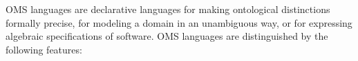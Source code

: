 \documentclass[10pt, a4paper]{isov2}
\newcommand*{\IS}{OMG Specification\xspace}
\newcommand*{\DOL}{\ensuremath{\mathsf{DOL}}\xspace}
\renewcommand{\clauserefname}{clause}
\renewcommand{\cref}[1]{\clauserefname~\ref{#1}}
\begin{document}
%
%
%
%
%


 OMS languages are declarative languages for making ontological distinctions formally precise, for modeling a domain in an unambiguous way, or for expressing algebraic specifications of software.   OMS languages are distinguished by the following features:
\end{document}
